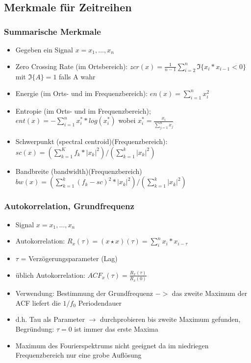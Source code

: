 \documentclass{article} %
\begin{document}
	\subsection{Merkmale für Zeitreihen}
		\subsubsection{Summarische Merkmale}
		\begin{itemize}
			\item Gegeben ein Signal $x = x_1,\dots,x_n$
			\item Zero Crossing Rate (im Ortsbereich): $zcr(x) = \frac{1}{n-1} \sum_{i=2}^{n} \mathfrak{I}\{x_i*x_{i-1} < 0\}$ mit $\mathfrak{I}\{A\} = 1$ falls A wahr
			\item Energie (im Orts- und im Frequenzbereich): $en(x) = \sum_{i=1}^{n} x_i^2$
			\item Entropie (im Orts- und im Frequenzbereich); $ent(x) = -\sum_{i=1}^{n} x_i^**log(x_i^*)$ wobei $x_i^* = \frac{x_i}{\sum_{j=1}^{n}x_j}$
			\item Schwerpunkt (spectral centroid)(Frequenzbereich): $sc(x) = (\sum_{k=1}^{K}f_k*|x_k|^2)/(\sum_{k=1}^{k}|x_k|^2)$
			\item Bandbreite (bandwidth)(Frequenzbereich) $bw(x) = (\sum_{k=1}^{k}(f_k-sc)^2*|x_k|^2)/(\sum_{k=1}^{k}|x_k|^2)$
		\end{itemize}
		\subsubsection{Autokorrelation, Grundfrequenz}
		\begin{itemize}
			\item Signal $x = x_1,\dots,x_n$
			\item Autokorrelation: $R_x(\tau) = (x\star x)(\tau) = \sum_{i}^{n} x_i*x_{i-\tau}$
			\item $\tau$ = Verzögerungsparameter (Lag)
			\item üblich Autokorrelation: $ACF_x(\tau) = \frac{R_x(\tau)}{R_x(0)}$
			\item Verwendung: Bestimmung der Grundfrequenz $->$ das zweite Maximum der ACF liefert die $1/f_0$ Periodendauer
			\item d.h. Tau als Parameter $\rightarrow$ durchprobieren bis zweite Maximum gefunden, Begründung: $\tau = 0$ ist immer das erste Maxima
			\item Maximum des Fourierspektrums nicht geeignet da im niedriegen Frequenzbereich nur eine grobe Auflösung
		\end{itemize}
\end{document}
